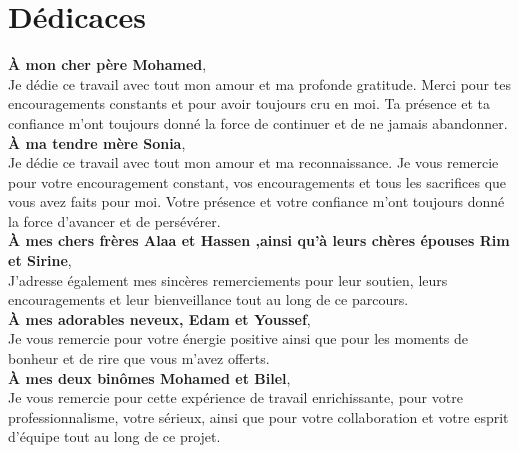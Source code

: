 
\chapter*{Dédicaces}

\vspace{12pt}

\begin{center}
  \begin{minipage}{0.85\textwidth}
    \centering
    \normalsize\itshape

    \textbf{À mon cher père Mohamed},\\

    Je dédie ce travail avec tout mon amour et ma profonde gratitude. Merci pour tes encouragements constants et pour avoir toujours cru en moi. Ta présence et ta confiance m'ont toujours donné la force de continuer et de ne jamais abandonner.\\

    \textbf{À ma tendre mère Sonia},\\

 Je dédie ce travail avec tout mon amour et ma reconnaissance. Je vous remercie pour votre encouragement  constant, vos encouragements et tous les sacrifices que vous avez faits pour moi. Votre présence et votre confiance m’ont toujours donné la force d’avancer et de persévérer.\\

    \textbf{À mes chers frères Alaa et Hassen ,ainsi qu'à leurs chères épouses Rim et Sirine},\\

    J'adresse également mes sincères remerciements pour leur soutien, leurs encouragements et leur bienveillance tout au long de ce parcours.\\

    \textbf{À mes adorables neveux, Edam et Youssef},\\

    Je vous remercie pour votre énergie positive ainsi que pour les moments de bonheur et de rire que vous m'avez offerts.\\

    \textbf{À mes deux binômes Mohamed et Bilel},\\

    Je vous remercie pour cette expérience de travail enrichissante, pour votre professionnalisme, votre sérieux, ainsi que pour votre collaboration et votre esprit d'équipe tout au long de ce projet.\\


\end{minipage}
\end{center}
